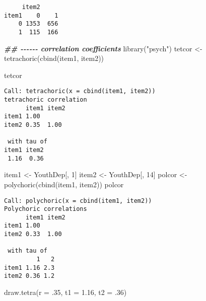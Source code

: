 \documentclass[
]{book}
\newenvironment{Shaded}{\begin{snugshade}}{\end{snugshade}}
\newcommand{\AttributeTok}[1]{\textcolor[rgb]{0.77,0.63,0.00}{#1}}
\newcommand{\DecValTok}[1]{\textcolor[rgb]{0.00,0.00,0.81}{#1}}
\newcommand{\DocumentationTok}[1]{\textcolor[rgb]{0.56,0.35,0.01}{\textbf{\textit{#1}}}}
\newcommand{\FloatTok}[1]{\textcolor[rgb]{0.00,0.00,0.81}{#1}}
\newcommand{\FunctionTok}[1]{\textcolor[rgb]{0.00,0.00,0.00}{#1}}
\newcommand{\NormalTok}[1]{#1}
\newcommand{\OtherTok}[1]{\textcolor[rgb]{0.56,0.35,0.01}{#1}}
\newcommand{\StringTok}[1]{\textcolor[rgb]{0.31,0.60,0.02}{#1}}
\begin{document}
\begin{verbatim}
     item2
item1    0    1
    0 1353  656
    1  115  166
\end{verbatim}

\begin{Shaded}
\begin{Highlighting}[]
\DocumentationTok{\#\# {-}{-}{-}{-}{-}{-} correlation coefficients}
\FunctionTok{library}\NormalTok{(}\StringTok{"psych"}\NormalTok{)}
\NormalTok{tetcor }\OtherTok{\textless{}{-}} \FunctionTok{tetrachoric}\NormalTok{(}\FunctionTok{cbind}\NormalTok{(item1, item2))}
\end{Highlighting}
\end{Shaded}

\begin{Shaded}
\begin{Highlighting}[]
\NormalTok{tetcor}
\end{Highlighting}
\end{Shaded}

\begin{verbatim}
Call: tetrachoric(x = cbind(item1, item2))
tetrachoric correlation 
      item1 item2
item1 1.00       
item2 0.35  1.00 

 with tau of 
item1 item2 
 1.16  0.36 
\end{verbatim}

\begin{Shaded}
\begin{Highlighting}[]
\NormalTok{item1 }\OtherTok{\textless{}{-}}\NormalTok{ YouthDep[, }\DecValTok{1}\NormalTok{]}
\NormalTok{item2 }\OtherTok{\textless{}{-}}\NormalTok{ YouthDep[, }\DecValTok{14}\NormalTok{]}
\NormalTok{polcor }\OtherTok{\textless{}{-}} \FunctionTok{polychoric}\NormalTok{(}\FunctionTok{cbind}\NormalTok{(item1, item2))}
\NormalTok{polcor}
\end{Highlighting}
\end{Shaded}

\begin{verbatim}
Call: polychoric(x = cbind(item1, item2))
Polychoric correlations 
      item1 item2
item1 1.00       
item2 0.33  1.00 

 with tau of 
         1   2
item1 1.16 2.3
item2 0.36 1.2
\end{verbatim}

\begin{Shaded}
\begin{Highlighting}[]
\FunctionTok{draw.tetra}\NormalTok{(}\AttributeTok{r =}\NormalTok{ .}\DecValTok{35}\NormalTok{, }\AttributeTok{t1 =} \FloatTok{1.16}\NormalTok{, }\AttributeTok{t2 =}\NormalTok{ .}\DecValTok{36}\NormalTok{)}
\end{Highlighting}
\end{Shaded}
\end{document}

